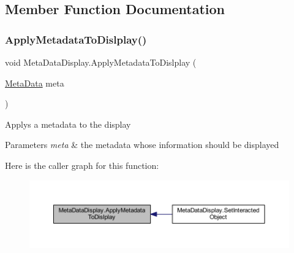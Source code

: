 \subsection{Member Function Documentation}
\mbox{\label{class_meta_data_display_ab982cb6123576aff6eae89a859899ad0}} 
\subsubsection{\texorpdfstring{Apply\+Metadata\+To\+Dislplay()}{ApplyMetadataToDislplay()}}
{\footnotesize\ttfamily void Meta\+Data\+Display.\+Apply\+Metadata\+To\+Dislplay (\begin{DoxyParamCaption}\item[{\mbox{\hyperlink{class_meta_data}{Meta\+Data}}}]{meta }\end{DoxyParamCaption})\hspace{0.3cm}{\ttfamily [private]}}



Applys a metadata to the display 


\begin{DoxyParams}{Parameters}
{\em meta} & the metadata whose information should be displayed\\
\hline
\end{DoxyParams}
Here is the caller graph for this function\+:
\nopagebreak
\begin{figure}[H]
\begin{center}
\leavevmode
\includegraphics[width=350pt]{class_meta_data_display_ab982cb6123576aff6eae89a859899ad0_icgraph}
\end{center}
\end{figure}
\mbox{\label{class_meta_data_display_a45d9e14c784a8526dafd62f8efec02a7}} 
